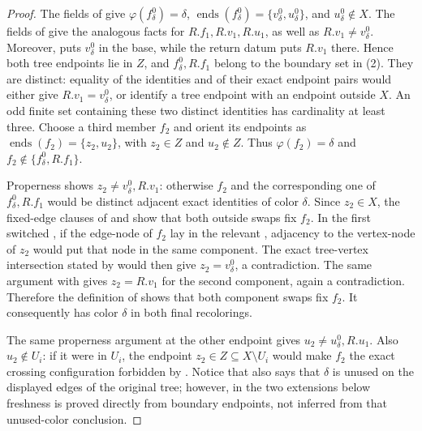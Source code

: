 \begin{proof}
The fields of  give
$\varphi(f^0_\delta)=\delta$,
$\operatorname{ends}(f^0_\delta)=\{v^0_\delta,u^0_\delta\}$, and
$u^0_\delta\notin X$.  The fields of
 give the analogous facts for
$R.f_1,R.v_1,R.u_1$, as well as $R.v_1\ne v^0_\delta$.
Moreover,  puts $v^0_\delta$ in
the base, while the return datum puts $R.v_1$ there.  Hence both tree
endpoints lie in $Z$, and $f^0_\delta,R.f_1$ belong to the boundary set
in (2).  They are distinct: equality of the identities and of their
exact endpoint pairs would either give $R.v_1=v^0_\delta$, or identify a
tree endpoint with an endpoint outside $X$.  An odd finite set containing
these two distinct identities has cardinality at least three.  Choose a
third member $f_2$ and orient its endpoints as
$\operatorname{ends}(f_2)=\{z_2,u_2\}$, with $z_2\in Z$ and
$u_2\notin Z$.  Thus $\varphi(f_2)=\delta$ and
$f_2\notin\{f^0_\delta,R.f_1\}$.

Properness shows $z_2\ne v^0_\delta,R.v_1$: otherwise $f_2$ and the
corresponding one of $f^0_\delta,R.f_1$ would be distinct adjacent exact
identities of color $\delta$.  Since $z_2\in X$, the fixed-edge clauses
of  and
 show that both outside
swaps fix $f_2$.  In the first switched
, if the edge-node of $f_2$ lay in the
relevant , adjacency to the vertex-node of
$z_2$ would put that node in the same component.  The exact tree-vertex
intersection stated by 
would then give $z_2=v^0_\delta$, a contradiction.  The same argument
with  gives
$z_2=R.v_1$ for the second component, again a contradiction.  Therefore
the definition of  shows that both
component swaps fix $f_2$.  It consequently has color $\delta$ in both
final recolorings.

The same properness argument at the other endpoint gives
$u_2\ne u^0_\delta,R.u_1$.  Also $u_2\notin U_i$: if it were in $U_i$,
the endpoint $z_2\in Z\subseteq X\setminus U_i$ would make $f_2$ the
exact crossing configuration forbidden by
.  Notice that
 also says that $\delta$ is unused
on the displayed edges of the original tree; however, in the two
extensions below freshness is proved directly from boundary endpoints,
not inferred from that unused-color conclusion.


\end{proof}
